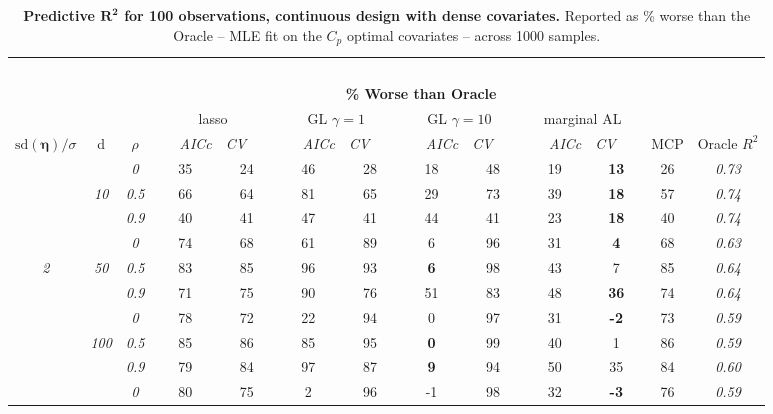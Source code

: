 \clearpage
\begin{table}
\vspace{-.2cm}
\footnotesize
\caption{ 
	{\bf  Predictive $\boldsymbol{R^2}$ for 100 observations, 
	continuous design with dense covariates.}
  Reported as  \% worse than the Oracle 
  -- MLE fit on the $C_p$ optimal covariates -- 
  across 1000 samples.}
\begin{center}
\begin{tabular}{ccc|cc|cc|cc|cc|c|c}
\hline &&&\multicolumn{9}{|c|}{~}\\[-1ex]
\multicolumn{3}{c}{~}&\multicolumn{9}{|c|}{\bf \% Worse than Oracle } &   \\[1ex]
& &
& \multicolumn{2}{c}{lasso} 
& \multicolumn{2}{c}{GL $\gamma=1$} 
& \multicolumn{2}{c}{GL $\gamma=10$} 
& \multicolumn{2}{c}{marginal AL} 
& \multicolumn{1}{c|}{~} & \\[-0.5ex]
$\mathrm{sd}(\boldsymbol{\eta})/\sigma$ & {\sf d} & $\rho$ 
& ~~~\scriptsize\it AICc & \multicolumn{1}{c}{\scriptsize\it CV~~~}
& ~~~\scriptsize\it AICc & \multicolumn{1}{c}{\scriptsize\it CV~~~}
& ~~~\scriptsize\it AICc & \multicolumn{1}{c}{\scriptsize\it CV~~~}
& ~~~\scriptsize\it AICc & \multicolumn{1}{c}{\scriptsize\it CV~~~} 
& \multicolumn{1}{c|}{ MCP} & Oracle $R^2$ \\[.5ex]
\hline\rule{0pt}{3ex}
& & \it  0  & 35 & 24 & 46 & 28 & 18 & 48 & 19 & {\bf 13} & 26 & \it  0.73 \\
 & \it  10  & \it  0.5  & 66 & 64 & 81 & 65 & 29 & 73 & 39 & {\bf 18} & 57 & \it  0.74 \\
& & \it  0.9  & 40 & 41 & 47 & 41 & 44 & 41 & 23 & {\bf 18} & 40 & \it  0.74 \\[1ex]
\cline{2-3}\rule{0pt}{3ex}
& & \it  0  & 74 & 68 & 61 & 89 & 6 & 96 & 31 & {\bf 4} & 68 & \it  0.63 \\
\it  2  & \it  50  & \it  0.5  & 83 & 85 & 96 & 93 & {\bf 6} & 98 & 43 & 7 & 85 & \it  0.64 \\
& & \it  0.9  & 71 & 75 & 90 & 76 & 51 & 83 & 48 & {\bf 36} & 74 & \it  0.64 \\[1ex]
\cline{2-3}\rule{0pt}{3ex}
& & \it  0  & 78 & 72 & 22 & 94 & 0 & 97 & 31 & {\bf -2} & 73 & \it  0.59 \\
 & \it  100  & \it  0.5  & 85 & 86 & 85 & 95 & {\bf 0} & 99 & 40 & 1 & 86 & \it  0.59 \\
& & \it  0.9  & 79 & 84 & 97 & 87 & {\bf 9} & 94 & 50 & 35 & 84 & \it  0.60 \\[1ex]
\cline{2-3}\rule{0pt}{3ex}
& & \it  0  & 80 & 75 & 2 & 96 & -1 & 98 & 32 & {\bf -3} & 76 & \it  0.59 \\

\end{tabular}
\end{center}
\end{table}
